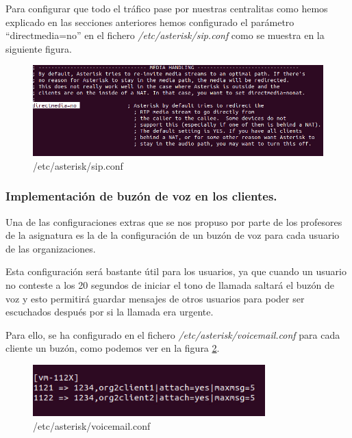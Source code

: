 \documentclass[a4paper]{article}
\begin{document}
 Para configurar que todo el tráfico pase por nuestras centralitas como hemos explicado en las secciones anteriores hemos configurado el parámetro ``directmedia=no'' en el fichero \textit{/etc/asterisk/sip.conf} como se muestra en la siguiente figura.

\begin{figure}[htb]
    \begin{center}
        \includegraphics[width=1\textwidth]{sipconf.jpg}
         \caption{/etc/asterisk/sip.conf}
         \label{fig:sip.conf}
    \end{center}
\end{figure}

\subsubsection{Implementación de buzón de voz en los clientes.}

Una de las configuraciones extras que se nos propuso por parte de los profesores de la asignatura es la de la configuración de un buzón de voz para cada usuario de las organizaciones. 


 Esta configuración será bastante útil para los usuarios, ya que cuando un usuario no conteste a los 20 segundos de iniciar el tono de llamada saltará el buzón de voz y esto permitirá guardar mensajes de otros usuarios para poder ser escuchados después por si la llamada era urgente.


 Para ello, se ha configurado en el fichero \textit{/etc/asterisk/voicemail.conf} para cada cliente un buzón, como podemos ver en la figura \ref{fig:voicemail.conf}.

\begin{figure}[htb]
    \begin{center}
        \includegraphics[width=0.8\textwidth]{voicemail.jpg}
         \caption{/etc/asterisk/voicemail.conf}
         \label{fig:voicemail.conf}
    \end{center}
\end{figure}
\end{document}

